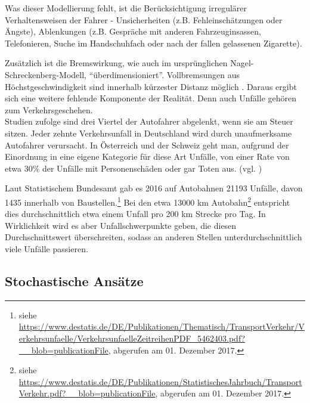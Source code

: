 Was dieser Modellierung fehlt, ist die Berücksichtigung irregulärer Verhaltensweisen der Fahrer - Unsicherheiten (z.B. Fehleinschätzungen oder Ängste), Ablenkungen (z.B. Gespräche mit anderen Fahrzeuginsassen, Telefonieren, Suche im Handschuhfach oder nach der fallen gelassenen Zigarette). 

Zusätzlich ist die Bremswirkung, wie auch im ursprünglichen Nagel-Schreckenberg-Modell, \enquote{über\-di\-men\-sio\-niert}. 
Vollbremsungen aus Höchstgeschwindigkeit sind innerhalb kürzester Distanz möglich \cite{acc-free}.
Daraus ergibt sich eine weitere fehlende Komponente der Realität.
Denn auch Unfälle gehören zum Verkehrsgeschehen. \\
Studien zufolge sind drei Viertel der Autofahrer abgelenkt, wenn sie am Steuer sitzen. 
Jeder zehnte Verkehrsunfall in Deutschland wird durch unaufmerksame Autofahrer verursacht. 
In Österreich und der Schweiz geht man, aufgrund der Einordnung in eine eigene Kategorie für diese Art Unfälle, von einer Rate von etwa 30\% der Unfälle mit Personenschäden oder gar Toten aus. (vgl. \cite{dvr-studie})

Laut Statistischem Bundesamt gab es 2016 auf Autobahnen 21193 Unfälle, davon 1435 innerhalb von Baustellen.\footnote{siehe \url{https://www.destatis.de/DE/Publikationen/Thematisch/TransportVerkehr/Verkehrsunfaelle/VerkehrsunfaelleZeitreihenPDF_5462403.pdf?__blob=publicationFile}, abgerufen am 01. Dezember 2017.} %
Bei den etwa 13000 km Autobahn\footnote{siehe \url{https://www.destatis.de/DE/Publikationen/StatistischesJahrbuch/TransportVerkehr.pdf?__blob=publicationFile}, abgerufen am 01. Dezember 2017.} %
entspricht dies durchschnittlich etwa einem Unfall pro 200 km Strecke pro Tag. 
In Wirklichkeit wird es aber Unfallschwerpunkte geben, die diesen Durchschnittswert überschreiten, sodass an anderen Stellen unterdurchschnittlich viele Unfälle passieren.






\subsection{Stochastische Ansätze}
\label{sec:stochastic-approaches}

